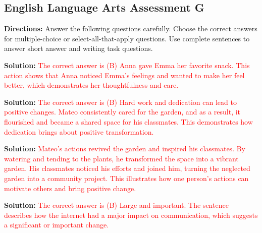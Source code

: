 \documentclass[12pt]{article}
\begin{document}
\subsection*{English Language Arts Assessment G}
\onehalfspacing

\begin{tcolorbox}[colframe=black!50, colback=white, title=Assessment Directions]
\textbf{Directions:} Answer the following questions carefully. Choose the correct answers for multiple-choice or select-all-that-apply questions. Use complete sentences to answer short answer and writing task questions.
\end{tcolorbox}

\begin{tcolorbox}[colframe=black!50, colback=white, title=Question 1]
\textbf{Solution:} \textcolor{red}{The correct answer is (B) Anna gave Emma her favorite snack. This action shows that Anna noticed Emma’s feelings and wanted to make her feel better, which demonstrates her thoughtfulness and care.}
\end{tcolorbox}

\begin{tcolorbox}[colframe=black!50, colback=white, title=Question 2]
\textbf{Solution:} \textcolor{red}{The correct answer is (B) Hard work and dedication can lead to positive changes. Mateo consistently cared for the garden, and as a result, it flourished and became a shared space for his classmates. This demonstrates how dedication brings about positive transformation.}
\end{tcolorbox}

\begin{tcolorbox}[colframe=black!50, colback=white, title=Question 3]
\textbf{Solution:} \textcolor{red}{Mateo’s actions revived the garden and inspired his classmates. By watering and tending to the plants, he transformed the space into a vibrant garden. His classmates noticed his efforts and joined him, turning the neglected garden into a community project. This illustrates how one person's actions can motivate others and bring positive change.}
\end{tcolorbox}

\begin{tcolorbox}[colframe=black!50, colback=white, title=Question 4]
\textbf{Solution:} \textcolor{red}{The correct answer is (B) Large and important. The sentence describes how the internet had a major impact on communication, which suggests a significant or important change.}
\end{tcolorbox}
\end{document}
